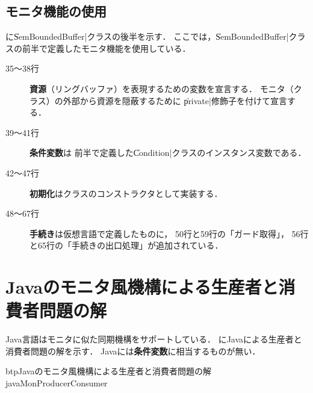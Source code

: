 \subsection{モニタ機能の使用}
に\|SemBoundedBuffer|クラスの後半を示す．
ここでは，\|SemBoundedBuffer|クラスの前半で定義したモニタ機能を使用している．

\begin{description}
\item [35〜38行]
{\bf 資源}（リングバッファ）を表現するための変数を宣言する．
モニタ（クラス）の外部から資源を隠蔽するために
\|private|修飾子を付けて宣言する．

\item [39〜41行]
{\bf 条件変数}は
前半で定義した\|Condition|クラスのインスタンス変数である．

\item [42〜47行]
{\bf 初期化}はクラスのコンストラクタとして実装する．

\item [48〜67行]
{\bf 手続き}は仮想言語で定義したものに，
50行と59行の「ガード取得」，
56行と65行の「手続きの出口処理」が追加されている．

\end{description}

% 
% 

\section{Javaのモニタ風機構による生産者と消費者問題の解}
Java言語はモニタに似た同期機構をサポートしている．
にJavaによる生産者と消費者問題の解を示す．
Javaには{\bf 条件変数}に相当するものが無い．

\begin{myfig}{btp}{Javaのモニタ風機構による生産者と消費者問題の解}
{javaMonProducerConsumer}

\end{myfig}

